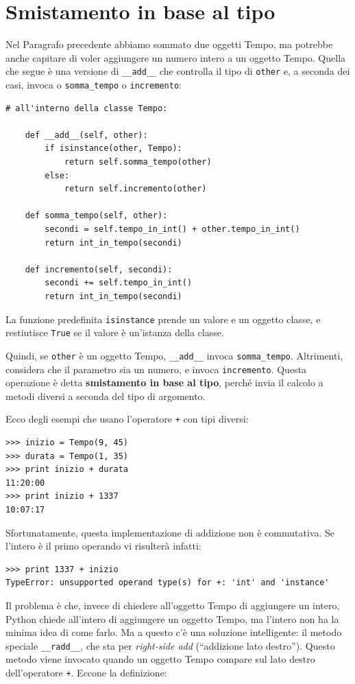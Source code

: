 \documentclass[10pt]{book}
\begin{document}
\section{Smistamento in base al tipo}

Nel Paragrafo precedente abbiamo sommato due oggetti Tempo, ma potrebbe anche capitare di voler aggiungere un numero intero a un oggetto Tempo. Quella che segue è una versione di \verb"__add__"
che controlla il tipo di {\tt other} e, a seconda dei casi, invoca o
\verb"somma_tempo" o {\tt incremento}:

\begin{verbatim}
# all'interno della classe Tempo:

    def __add__(self, other):
        if isinstance(other, Tempo):
            return self.somma_tempo(other)
        else:
            return self.incremento(other)

    def somma_tempo(self, other):
        secondi = self.tempo_in_int() + other.tempo_in_int()
        return int_in_tempo(secondi)

    def incremento(self, secondi):
        secondi += self.tempo_in_int()
        return int_in_tempo(secondi)
\end{verbatim}
%
La funzione predefinita {\tt isinstance} prende un valore e un oggetto classe, e restiutisce {\tt True} se il valore è un'istanza della classe.

Quindi, se {\tt other} è un oggetto Tempo, \verb"__add__" invoca
\verb"somma_tempo".  Altrimenti, considera che il parametro sia un numero, e invoca {\tt incremento}.  Questa operazione è detta {\bf smistamento in base al tipo}, perché invia il calcolo a metodi diversi a seconda del tipo di argomento.

Ecco degli esempi che usano l'operatore {\tt +} con tipi diversi:

\begin{verbatim}
>>> inizio = Tempo(9, 45)
>>> durata = Tempo(1, 35)
>>> print inizio + durata
11:20:00
>>> print inizio + 1337
10:07:17
\end{verbatim}
%
Sfortunatamente, questa implementazione di addizione non è commutativa. Se l'intero è il primo operando vi risulterà infatti:

\begin{verbatim}
>>> print 1337 + inizio
TypeError: unsupported operand type(s) for +: 'int' and 'instance'
\end{verbatim}
%
Il problema è che, invece di chiedere all'oggetto Tempo di aggiungere un intero, Python chiede all'intero di aggiungere un oggetto Tempo, ma l'intero non ha la minima idea di come farlo. Ma a questo c'è una soluzione intelligente: il metodo speciale \verb"__radd__", che sta per {\em right-side add} (``addizione lato destro'').
Questo metodo viene invocato quando un oggetto Tempo compare sul lato destro dell'operatore {\tt +}.  Eccone la definizione:
\end{document}
